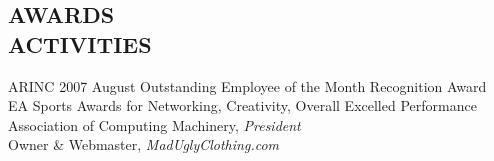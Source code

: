 \documentclass[margin]{res}
\begin{document}
\begin{resume}
\section{AWARDS \\ ACTIVITIES}
ARINC 2007 August Outstanding Employee of the Month Recognition Award \\
EA Sports Awards for Networking, Creativity, Overall Excelled Performance\\
Association of Computing Machinery, {\it President} \\
Owner \& Webmaster, {\it MadUglyClothing.com} \\



\end{resume}
\end{document}
